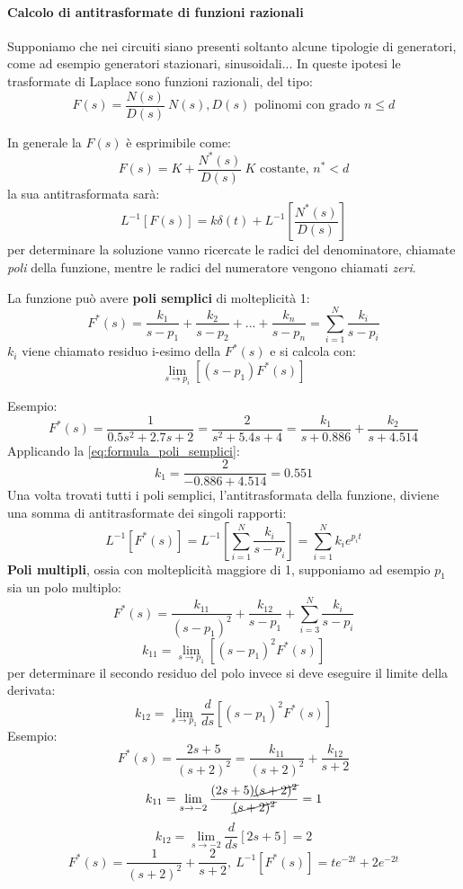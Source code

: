 
\paragraph{Calcolo di antitrasformate di funzioni razionali}
Supponiamo che nei circuiti siano presenti soltanto alcune tipologie di generatori, come ad esempio
generatori stazionari, sinusoidali... In queste ipotesi le trasformate di Laplace sono funzioni 
razionali, del tipo:
$$
F(s) = \frac{N(s)}{D(s)}\ N(s),D(s) \text{ polinomi con grado } n\leq d
$$

In generale la $F(s)$ è esprimibile come:
$$
F(s) = K + \frac{N^*(s)}{D(s)}\ K \text{ costante, } n^* < d
$$
la sua antitrasformata sarà:
$$
L^{-1}[F(s)] = k\delta(t) + L^{-1}\left[\frac{N^*(s)}{D(s)}\right] 
$$
per determinare la soluzione vanno ricercate le radici del denominatore, chiamate \textit{poli}
della funzione, mentre le radici del numeratore vengono chiamati \textit{zeri}.

La funzione può avere \textbf{poli semplici} di molteplicità 1:
$$
F^*(s) = \frac{k_1}{s-p_1} + \frac{k_2}{s-p_2} + ... + \frac{k_n}{s-p_n} = \sum_{i=1}^{N}\frac{k_i}{s-p_i}
$$
$k_i$ viene chiamato residuo i-esimo della $F^*(s)$ e si calcola con:
\begin{equation}
\lim_{s\to p_i} \left[(s-p_1)F^*(s)\right]
\label{eq:formula_poli_semplici}
\end{equation}

Esempio:
$$
F^*(s) = \frac{1}{0.5s^2+2.7s+2} = \frac{2}{s^2+5.4s+4} = \frac{k_1}{s+0.886} + \frac{k_2}{s+4.514}
$$
Applicando la \ref{eq:formula_poli_semplici}:
$$
k_1 = \frac{2}{-0.886+4.514} = 0.551
$$
Una volta trovati tutti i poli semplici, l'antitrasformata della funzione, diviene una somma di
antitrasformate dei singoli rapporti:
$$
L^{-1}[F^*(s)] = L^{-1}\left[\sum_{i=1}^{N}\frac{k_i}{s-p_i}\right] = \sum_{i=1}^{N} k_ie^{p_i t}
$$
\textbf{Poli multipli}, ossia con molteplicità maggiore di 1, supponiamo ad esempio $p_1$ sia un polo multiplo:
$$
F^*(s) = \frac{k_{11}}{(s-p_1)^2} + \frac{k_{12}}{s-p_1} + \sum_{i=3}^{N} \frac{k_i}{s-p_i}
$$
$$
k_{11} = \lim_{s\to p_1} \left[(s-p_1)^2F^*(s)\right]
$$
per determinare il secondo residuo del polo invece si deve eseguire il limite della derivata:
$$
k_{12} = \lim_{s\to p_1} \frac{d}{ds} \left[(s-p_1)^2 F^*(s)\right]
$$
Esempio:
$$
F^*(s) = \frac{2s+5}{(s+2)^2} = \frac{k_{11}}{(s+2)^2} + \frac{k_{12}}{s+2}
$$
$$
k_{11} = \lim_{s\to-2} \frac{(2s+5)\cancel{(s+2)^2}}{\cancel{(s+2)^2}} = 1
$$
$$
k_{12} = \lim_{s \to -2} \frac{d}{ds} [2s+5] = 2
$$
$$
F^*(s) = \frac{1}{(s+2)^2}+\frac{2}{s+2},\ L^{-1}[F^*(s)] = te^{-2t}+2e^{-2t}
$$

